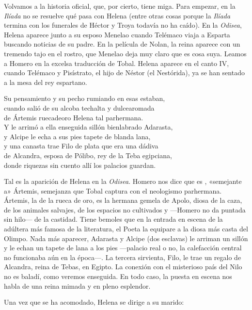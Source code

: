Volvamos a la historia oficial, que, por cierto, tiene miga. Para empezar, en la \emph{Ilíada} no se resuelve qué pasa con Helena (entre otras cosas porque la \emph{Ilíada} termina con los funerales de Héctor y Troya todavía no ha caído). En la \emph{Odisea}, Helena aparece junto a su esposo Menelao cuando Telémaco viaja a Esparta buscando noticias de su padre. En la película de Nolan, la reina aparece con un tremendo tajo en el rostro, que Menelao deja muy claro que es cosa suya. Leamos a Homero en la excelsa traducción de Tobal. Helena aparece en el canto IV, cuando Telémaco y Pisístrato, el hijo de Néstor (el Nestórida), ya se han sentado a la mesa del rey espartano.

\begin{versocita}
Su pensamiento y su pecho rumiando en esas estaban,\\
cuando salió de su alcoba techalta y dulcearomada\\
de Ártemis ruecadeoro Helena tal parhermana.\\
Y le arrimó a ella enseguida sillón bienlabrado Adarasta,\\
y Alcipe le echa a sus pies tapete de blanda lana,\\
y una canasta trae Filo de plata que era una dádiva\\
de Alcandra, esposa de Pólibo, rey de la Teba egipciana,\\
donde riquezas sin cuento allí los palacios guardan.
\end{versocita}

Tal es la aparición de Helena en la \emph{Odisea}. Homero nos dice que es , «semejante a» Ártemis, semejanza que Tobal captura con el neologismo parhermana. Ártemis, la de la rueca de oro, es la hermana gemela de Apolo, diosa de la caza, de los animales salvajes, de los espacios no cultivados y ---Homero no da puntada sin hilo--- de la castidad. Tiene bemoles que en la entrada en escena de la adúltera más famosa de la literatura, el Poeta la equipare a la diosa más casta del Olimpo. Nada más aparecer, Adarasta y Alcipe (dos esclavas) le arriman un sillón y le echan un tapete de lana a los pies ---palacio real o no, la calefacción central no funcionaba aún en la época---. La tercera sirvienta, Filo, le trae un regalo de Alcandra, reina de Tebas, en Egipto. La conexión con el misterioso país del Nilo no es baladí, como veremos enseguida. En todo caso, la puesta en escena nos habla de una reina mimada y en pleno esplendor.

Una vez que se ha acomodado, Helena se dirige a su marido:


